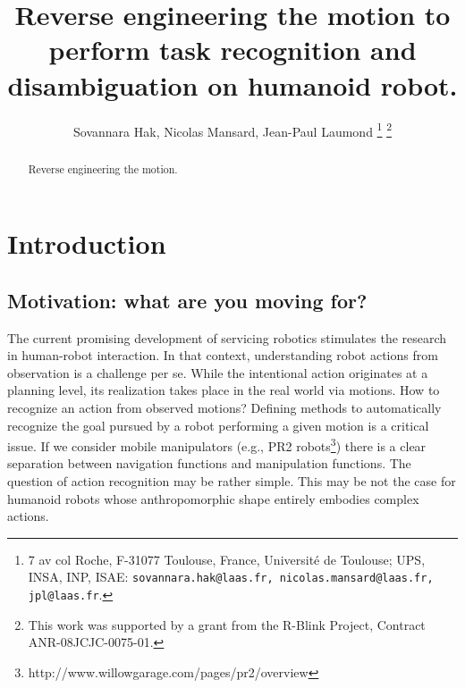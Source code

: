 \documentclass[letterpaper, 10pt, conference]{ieeeconf}      %
\title{\LARGE \bf
Reverse engineering the motion to perform task recognition and disambiguation on humanoid robot.
}
\author{Sovannara Hak, Nicolas Mansard, Jean-Paul Laumond%
  \thanks{7 av col Roche, F-31077 Toulouse, France, Universit\'e de Toulouse; UPS, INSA, INP,
    ISAE: {\tt\small sovannara.hak@laas.fr, nicolas.mansard@laas.fr, jpl@laas.fr}.}
  \thanks{This work was supported by a grant from the R-Blink Project, Contract
    ANR-08JCJC-0075-01.}  }
\begin{document}
\maketitle
\thispagestyle{empty}
\pagestyle{empty}


\begin{abstract}
Reverse engineering the motion.
\end{abstract}

\section{Introduction}
\subsection{Motivation: what are you moving for?}

The current promising development of servicing robotics stimulates the
research in human-robot interaction. In that context, understanding
robot actions from observation is a challenge per se. While the
intentional action originates at a planning level, its realization takes
place in the real world via motions. How to recognize an action from
observed motions? Defining methods to automatically recognize the goal
pursued by a robot performing a given motion is a critical issue. If we
consider mobile manipulators (e.g., PR2 robots\footnote{{http://www.willowgarage.com/pages/pr2/overview}})
there is a clear separation between navigation functions and
manipulation functions. The question of action recognition may be rather
simple. This may be not the case for humanoid robots whose
anthropomorphic shape entirely embodies complex actions. 
\end{document}
